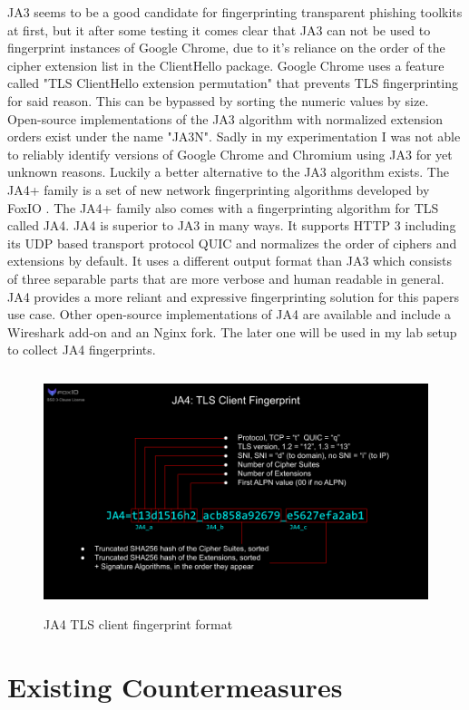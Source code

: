 \documentclass[12pt]{scrbook}
\begin{document}
JA3 seems to be
a good candidate for fingerprinting transparent phishing toolkits at first,
but it after some testing it comes clear that JA3 can not be used to
fingerprint instances of Google Chrome, due to it's reliance on the order of
the cipher extension list in the ClientHello package. Google Chrome uses a
feature called "TLS ClientHello extension permutation" that prevents TLS
fingerprinting for said reason. This can be bypassed by sorting the numeric
values by size. Open-source implementations of the JA3 algorithm with
normalized extension orders exist under the name "JA3N". Sadly in my
experimentation I was not able to reliably identify versions of Google
Chrome and Chromium using JA3 for yet unknown reasons.
Luckily a better alternative
to the JA3 algorithm exists. The JA4+ family is a set of new network
fingerprinting algorithms developed by FoxIO \cite{foxIOJa4}. The JA4+
family also comes with a fingerprinting algorithm for TLS called JA4. JA4 is
superior to JA3 in many ways. It supports HTTP 3 including its UDP based
transport protocol QUIC and normalizes the order of ciphers and extensions
by default. It uses a different output format than JA3 which consists of
three separable parts that are more verbose and human readable in general. JA4
provides a more reliant and expressive fingerprinting solution for this
papers use case. Other open-source implementations of JA4 are available and
include a Wireshark add-on and an Nginx fork. The later one will be used in
my lab setup to collect JA4 fingerprints.

\begin{figure}[!htb] \centering
	\includegraphics[height=7cm]{./images/JA4.png} \caption{JA4 TLS client
		fingerprint format} \end{figure}

\newpage
\section{Existing Countermeasures}
\end{document}
